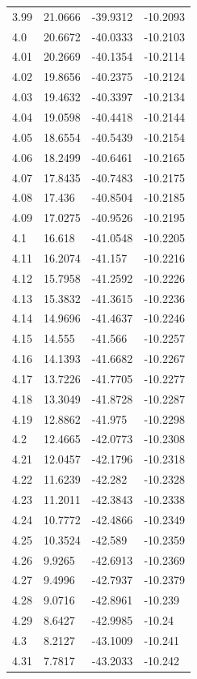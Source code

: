 \begin{tabular}{llll}
3.99 & 21.0666 & -39.9312 & -10.2093 \\
4.0 & 20.6672 & -40.0333 & -10.2103 \\
4.01 & 20.2669 & -40.1354 & -10.2114 \\
4.02 & 19.8656 & -40.2375 & -10.2124 \\
4.03 & 19.4632 & -40.3397 & -10.2134 \\
4.04 & 19.0598 & -40.4418 & -10.2144 \\
4.05 & 18.6554 & -40.5439 & -10.2154 \\
4.06 & 18.2499 & -40.6461 & -10.2165 \\
4.07 & 17.8435 & -40.7483 & -10.2175 \\
4.08 & 17.436 & -40.8504 & -10.2185 \\
4.09 & 17.0275 & -40.9526 & -10.2195 \\
4.1 & 16.618 & -41.0548 & -10.2205 \\
4.11 & 16.2074 & -41.157 & -10.2216 \\
4.12 & 15.7958 & -41.2592 & -10.2226 \\
4.13 & 15.3832 & -41.3615 & -10.2236 \\
4.14 & 14.9696 & -41.4637 & -10.2246 \\
4.15 & 14.555 & -41.566 & -10.2257 \\
4.16 & 14.1393 & -41.6682 & -10.2267 \\
4.17 & 13.7226 & -41.7705 & -10.2277 \\
4.18 & 13.3049 & -41.8728 & -10.2287 \\
4.19 & 12.8862 & -41.975 & -10.2298 \\
4.2 & 12.4665 & -42.0773 & -10.2308 \\
4.21 & 12.0457 & -42.1796 & -10.2318 \\
4.22 & 11.6239 & -42.282 & -10.2328 \\
4.23 & 11.2011 & -42.3843 & -10.2338 \\
4.24 & 10.7772 & -42.4866 & -10.2349 \\
4.25 & 10.3524 & -42.589 & -10.2359 \\
4.26 & 9.9265 & -42.6913 & -10.2369 \\
4.27 & 9.4996 & -42.7937 & -10.2379 \\
4.28 & 9.0716 & -42.8961 & -10.239 \\
4.29 & 8.6427 & -42.9985 & -10.24 \\
4.3 & 8.2127 & -43.1009 & -10.241 \\
4.31 & 7.7817 & -43.2033 & -10.242 \\

\end{tabular}

